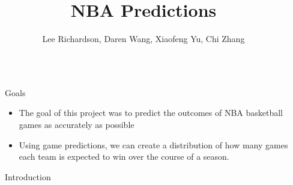 \documentclass[final, 14pt]{beamer}
\title{NBA Predictions}%
\author{Lee Richardson, Daren Wang, Xiaofeng Yu, Chi Zhang} %
\institute{Carnegie Mellon University} %
\newlength{\sepwid}
\newlength{\onecolwid}
\begin{document}

\setlength{\belowcaptionskip}{2ex} %
\setlength\belowdisplayshortskip{2ex} %

\begin{frame}[t] %

\begin{columns}[t] %

\begin{column}{\sepwid}\end{column} %

\begin{column}{\onecolwid} %


\begin{block}{Goals}

\begin{itemize}

  \item The goal of this project was to predict the outcomes of NBA basketball games as accurately as possible

  \item Using game predictions, we can create a distribution of how many games each team is expected to win over the course of a season. 

\end{itemize}

\end{block}


\begin{block}{Introduction}

	


\end{block}
\end{column}
\end{columns}
\end{frame}
\end{document}
